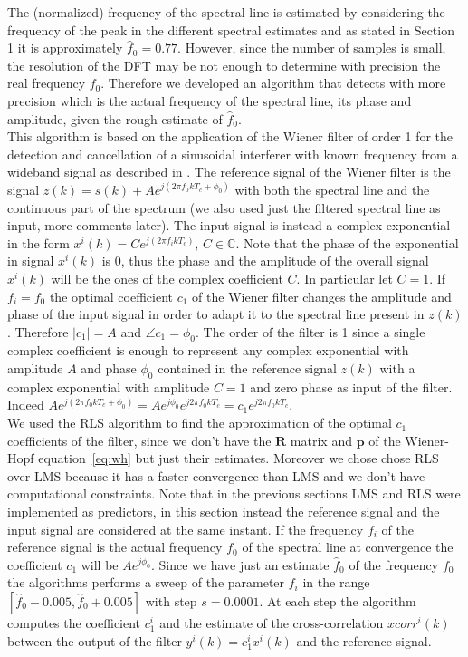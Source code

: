 \documentclass[10pt]{article}
\numberwithin{equation}{section}
\begin{document}
The (normalized) frequency of the spectral line is estimated by considering the frequency of the peak in the different spectral estimates and as stated in Section 1 it is approximately $\hat{f}_0 = 0.77$. However, since the number of samples is small, the resolution of the DFT may be not enough to determine with precision the real frequency $f_0$. Therefore we developed an algorithm that detects with more precision which is the actual frequency of the spectral line, its phase and amplitude, given the rough estimate of $\hat{f}_0$. \\
This algorithm is based on the application of the Wiener filter of order 1 for the detection and cancellation of a sinusoidal interferer with known frequency from a wideband signal as described in \cite{bc}.
The reference signal of the Wiener filter is the signal $z(k) = s(k) + Ae^{j(2 \pi f_0 k T_c + \phi_0)}$ with both the spectral line and the continuous part of the spectrum (we also used just the filtered spectral line as input, more comments later). The input signal is instead a complex exponential in the form $x^i(k) = C e^{j (2 \pi f_i k T_c)}$, $C \in \mathbb{C}$. Note that the phase of the exponential in signal $x^i(k)$ is 0, thus the phase and the amplitude of the overall signal $x^i(k)$ will be the ones of the complex coefficient $C$. In particular let $C = 1$. If $f_i = f_0$ the optimal coefficient $c_1$ of the Wiener filter changes the amplitude and phase of the input signal in order to adapt it to the spectral line present in $z(k)$. Therefore $|c_1| = A$ and $\angle{c_1} = \phi_0$.  The order of the filter is 1 since a single complex coefficient is enough to represent any complex exponential with amplitude $A$ and phase $\phi_0$ contained in the reference signal $z(k)$ with a complex exponential with amplitude $C = 1$ and zero phase as input of the filter. Indeed $Ae^{j(2 \pi f_0 k T_c + \phi_0)} = Ae^{j\phi_0}e^{j2 \pi f_0 k T_c} = c_1 e^{j2 \pi f_0 k T_c}$.\\
We used the RLS algorithm to find the approximation of the optimal $c_1$ coefficients of the filter, since we don't have the $\mathbf{R}$ matrix and $\mathbf{p}$ of the Wiener-Hopf equation~\ref{eq:wh} but just their estimates. Moreover we chose chose RLS over LMS because it has a faster convergence than LMS and we don't have computational constraints. Note that in the previous sections LMS and RLS were implemented as predictors, in this section instead the reference signal and the input signal are considered at the same instant. If the frequency $f_i$ of the reference signal is the actual frequency $f_0$ of the spectral line at convergence the coefficient $c_1$ will be $A e^{j\phi_0}$. Since we have just an estimate $\hat{f}_0$ of the frequency $f_0$ the algorithms performs a sweep of the parameter $f_i$ in the range $[\hat{f}_0 - 0.005, \hat{f}_0 + 0.005]$ with step $s = 0.0001$. At each step the algorithm computes the coefficient $c_1^i$ and the estimate of the cross-correlation $xcorr^i(k)$ between the output of the filter $y^i(k) = c_1^i x^i(k)$ and the reference signal.
\end{document}
